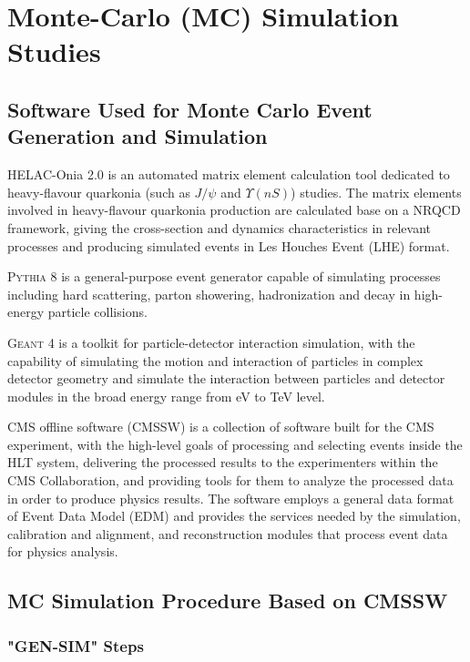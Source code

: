 \documentclass[10pt,twocolumn]{article}
\begin{document}
\section{Monte-Carlo (MC) Simulation Studies}

\subsection{Software Used for Monte Carlo Event Generation and Simulation}

HELAC-Onia 2.0 is an automated matrix element calculation tool dedicated to heavy-flavour quarkonia (such as $J/\psi$ and $\Upsilon(nS)$) studies. The matrix elements involved in heavy-flavour quarkonia production are calculated base on a NRQCD framework, giving the cross-section and dynamics characteristics in relevant processes and producing simulated events in Les Houches Event (LHE) format.\cite{HS_SHAO_HO}\cite{HS_SHAO_HO_2}

\textsc{Pythia 8} is a general-purpose event generator capable of simulating processes including hard scattering, parton showering, hadronization and decay in high-energy particle collisions.\cite{PYTHIA_8_2}

\textsc{Geant 4} is a toolkit for particle-detector interaction simulation, with the capability of simulating the motion and interaction of particles in complex detector geometry and simulate the interaction between particles and detector modules in the broad energy range from eV to TeV level.\cite{GEANT4}

CMS offline software (\textsc{CMSSW}) is a collection of software built for the CMS experiment, with the high-level goals of processing and selecting events inside the HLT system, delivering the processed results to the experimenters within the CMS Collaboration, and providing tools for them to analyze the processed data in order to produce physics results. The software employs a general data format of Event Data Model (EDM) and provides the services needed by the simulation, calibration and alignment, and reconstruction modules that process event data for physics analysis.\cite{CMS_PHYS_TDR}

\subsection{MC Simulation Procedure Based on \textsc{CMSSW}}\label{sec:MC-FullChain}

\subsubsection{"GEN-SIM" Steps}
\end{document}
